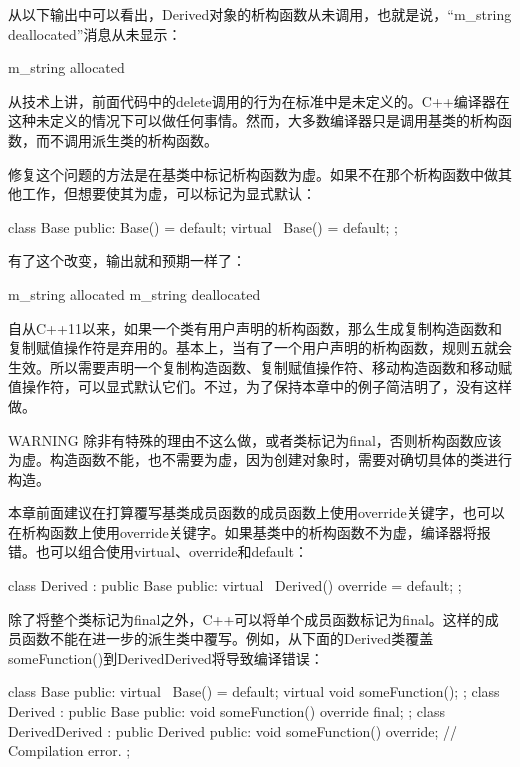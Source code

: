 从以下输出中可以看出，Derived对象的析构函数从未调用，也就是说，“m\_string deallocated”消息从未显示：

\begin{cpp}
m_string allocated
\end{cpp}

从技术上讲，前面代码中的delete调用的行为在标准中是未定义的。C++编译器在这种未定义的情况下可以做任何事情。然而，大多数编译器只是调用基类的析构函数，而不调用派生类的析构函数。

修复这个问题的方法是在基类中标记析构函数为虚。如果不在那个析构函数中做其他工作，但想要使其为虚，可以标记为显式默认：

\begin{cpp}
class Base
{
    public:
        Base() = default;
        virtual ~Base() = default;
};
\end{cpp}

有了这个改变，输出就和预期一样了：

\begin{shell}
m_string allocated
m_string deallocated
\end{shell}

自从C++11以来，如果一个类有用户声明的析构函数，那么生成复制构造函数和复制赋值操作符是弃用的。基本上，当有了一个用户声明的析构函数，规则五就会生效。所以需要声明一个复制构造函数、复制赋值操作符、移动构造函数和移动赋值操作符，可以显式默认它们。不过，为了保持本章中的例子简洁明了，没有这样做。

\begin{myWarning}{WARNING}
除非有特殊的理由不这么做，或者类标记为final，否则析构函数应该为虚。构造函数不能，也不需要为虚，因为创建对象时，需要对确切具体的类进行构造。
\end{myWarning}

本章前面建议在打算覆写基类成员函数的成员函数上使用override关键字，也可以在析构函数上使用override关键字。如果基类中的析构函数不为虚，编译器将报错。也可以组合使用virtual、override和default：

\begin{cpp}
class Derived : public Base
{
    public:
        virtual ~Derived() override = default;
};
\end{cpp}


除了将整个类标记为final之外，C++可以将单个成员函数标记为final。这样的成员函数不能在进一步的派生类中覆写。例如，从下面的Derived类覆盖someFunction()到DerivedDerived将导致编译错误：

\begin{cpp}
class Base
{
    public:
        virtual ~Base() = default;
        virtual void someFunction();
};
class Derived : public Base
{
    public:
        void someFunction() override final;
};
class DerivedDerived : public Derived
{
    public:
        void someFunction() override; // Compilation error.
};
\end{cpp}






